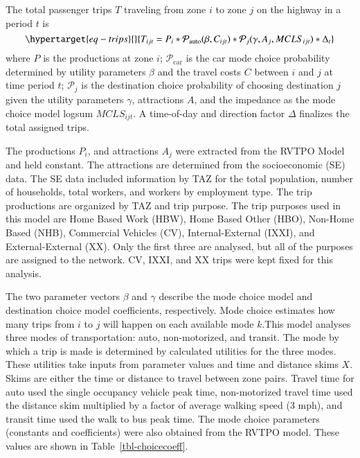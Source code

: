 \documentclass[
  letterpaper,
  authoryear,
  review,
  3p]{elsarticle}
\begin{document}
The total passenger trips \(T\) traveling from zone \(i\) to zone \(j\)
on the highway in a period \(t\) is
\begin{equation}\protect\hypertarget{eq-trips}{}{
T_{ijt} = P_i * \mathcal{P}_{\mathrm{auto}}(\beta, C_{ijt}) * \mathcal{P}_j(\gamma, A_j, MCLS_{ijt}) * \Delta_t 
}\label{eq-trips}\end{equation} where \(P\) is the productions at zone
\(i\); \(\mathcal{P}_{\mathrm{car}}\) is the car mode choice probability
determined by utility parameters \(\beta\) and the travel costs \(C\)
between \(i\) and \(j\) at time period \(t\); \(\mathcal{P}_{j}\) is the
destination choice probability of choosing destination \(j\) given the
utility parameters \(\gamma\), attractions \(A\), and the impedance as
the mode choice model logsum \(MCLS_{ijt}\). A time-of-day and direction
factor \(\Delta\) finalizes the total assigned trips.

The productions \(P_i\), and attractions \(A_j\) were extracted from the
RVTPO Model and held constant. The attractions are determined from the
socioeconomic (SE) data. The SE data included information by TAZ for the
total population, number of households, total workers, and workers by
employment type. The trip productions are organized by TAZ and trip
purpose. The trip purposes used in this model are Home Based Work (HBW),
Home Based Other (HBO), Non-Home Based (NHB), Commercial Vehicles (CV),
Internal-External (IXXI), and External-External (XX). Only the first
three are analysed, but all of the purposes are assigned to the network.
CV, IXXI, and XX trips were kept fixed for this analysis.

The two parameter vectors \(\beta\) and \(\gamma\) describe the mode
choice model and destination choice model coefficients, respectively.
Mode choice estimates how many trips from \(i\) to \(j\) will happen on
each available mode \(k\).This model analyses three modes of
transportation: auto, non-motorized, and transit. The mode by which a
trip is made is determined by calculated utilities for the three modes.
These utilities take inputs from parameter values and time and distance
skims \(X\). Skims are either the time or distance to travel between
zone pairs. Travel time for auto used the single occupancy vehicle peak
time, non-motorized travel time used the distance skim multiplied by a
factor of average walking speed (3 mph), and transit time used the walk
to bus peak time. The mode choice parameters (constants and
coefficients) were also obtained from the RVTPO model. These values are
shown in Table~\ref{tbl-choicecoeff}.
\end{document}
